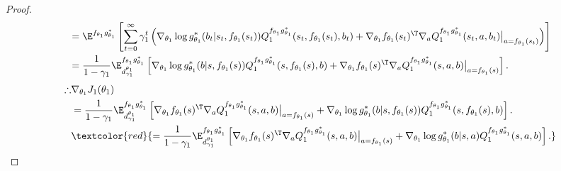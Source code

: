 \documentclass[a4paper,10pt,dvipdfmx]{jsarticle}
\begin{document}
\begin{proof}
\begin{align}
    &=\E^{f_{\theta_1}g_{\theta_1}^*}\left[\sum_{t=0}^{\infty}\gamma_1^t\left(\nabla_{\theta_1}\log g_{\theta_1}^*(b_t|s_t,f_{\theta_1}(s_t))Q_1^{f_{\theta_1}g_{\theta_1}^*}(s_t,f_{\theta_1}(s_t),b_t)
    +\nabla_{\theta_1}f_{\theta_1}(s_t)^{\T}\nabla_{a}Q_1^{f_{\theta_1}g_{\theta_1}^*}(s_t,a,b_t)\big|_{a=f_{\theta_1}(s_t)}\right)\right]\\
    &=\dfrac{1}{1-\gamma_1}\E_{d_{\gamma_1}^{\theta_1}}^{f_{\theta_1}g_{\theta_1}^*}\left[\nabla_{\theta_1}\log g_{\theta_1}^*(b|s,f_{\theta_1}(s))Q_1^{f_{\theta_1}g_{\theta_1}^*}(s,f_{\theta_1}(s),b)
    +\nabla_{\theta_1}f_{\theta_1}(s)^{\T}\nabla_{a}Q_1^{f_{\theta_1}g_{\theta_1}^*}(s,a,b)\big|_{a=f_{\theta_1}(s)}\right].
\end{align}
\begin{equation}
\begin{aligned}
    \therefore&\nabla_{\theta_1}J_1(\theta_1)\\
    &=\dfrac{1}{1-\gamma_1}\E_{d_{\gamma_1}^{\theta_1}}^{f_{\theta_1}g_{\theta_1}^*}\left[\nabla_{\theta_1}f_{\theta_1}(s)^{\T}\nabla_{a}Q_1^{f_{\theta_1}g_{\theta_1}^*}(s,a,b)\big|_{a=f_{\theta_1}(s)}+\nabla_{\theta_1}\log g_{\theta_1}^*(b|s,f_{\theta_1}(s))Q_1^{f_{\theta_1}g_{\theta_1}^*}(s,f_{\theta_1}(s),b)\right].\label{eq:SPG_qr_bbf_det_first}\\
    &\textcolor{red}{=\dfrac{1}{1-\gamma_1}\E_{d_{\gamma_1}^{\theta_1}}^{f_{\theta_1}g_{\theta_1}^*}\left[\nabla_{\theta_1}f_{\theta_1}(s)^{\T}\nabla_{a}Q_1^{f_{\theta_1}g_{\theta_1}^*}(s,a,b)\big|_{a=f_{\theta_1}(s)}+\nabla_{\theta_1}\log g_{\theta_1}^*(b|s,a)Q_1^{f_{\theta_1}g_{\theta_1}^*}(s,a,b)\right].}
\end{aligned}
\end{equation}


\end{proof}
\end{document}
